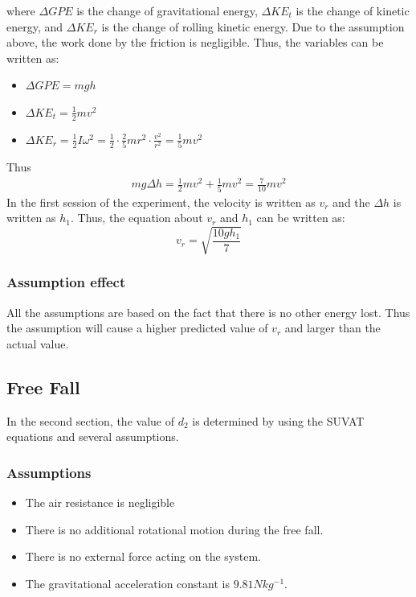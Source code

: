 \documentclass{article}
\begin{document}
        where $\Delta GPE$ is the change of gravitational energy, $\Delta KE_t$ is the change of kinetic energy, and $\Delta KE_r$ is the change of rolling kinetic energy. Due to the assumption above, the work done by the friction is negligible. Thus, the variables can be written as:
        \begin{itemize}
            \item $\Delta GPE = mgh$ 
            \item $\Delta KE_t = \frac{1}{2}mv^2$ 
            \item $\Delta KE_r = \frac{1}{2}I\omega^2 = \frac{1}{2}\cdot \frac{2}{5}mr^2\cdot\frac{v^2}{r^2} = \frac{1}{5}mv^2$ 
        \end{itemize}
        Thus 
        \begin{equation}
            \begin{aligned}
                mg\Delta h = \frac{1}{2}mv^2 + \frac{1}{5}mv^2 = \frac{7}{10}mv^2 \nonumber
            \end{aligned}
        \end{equation}
        In the first session of the experiment, the velocity is written as $v_r$ and the $\Delta h$ is written as $h_1$. Thus, the equation about $v_r$ and $h_1$ can be written as:
        \begin{equation}\label{vr}
            v_r = \sqrt{\frac{10gh_1}{7}}
        \end{equation}
        \subsubsection{Assumption effect}
            All the assumptions are based on the fact that there is no other energy lost. Thus the assumption will cause a higher predicted value of $v_r$ and larger than the actual value.
    \subsection{Free Fall}
    In the second section, the value of $d_2$ is determined by using the SUVAT equations and several assumptions.
        \subsubsection{Assumptions}
            \begin{itemize}
                \item The air resistance is negligible
                \item There is no additional rotational motion during the free fall.
                \item There is no external force acting on the system.
                \item The gravitational acceleration constant is $9.81 Nkg^{-1}$.
            \end{itemize}
\end{document}
